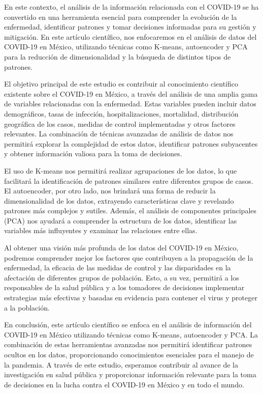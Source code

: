 \documentclass[a4paper,
               ]{jacow}
\begin{document}
En este contexto, el análisis de la información relacionada con el COVID-19 se ha convertido en una herramienta esencial para comprender la evolución de la enfermedad, identificar patrones y tomar decisiones informadas para su gestión y mitigación. En este artículo científico, nos enfocaremos en el análisis de datos del COVID-19 en México, utilizando técnicas como K-means, autoencoder y PCA para la reducción de dimensionalidad y la búsqueda de distintos tipos de patrones.

El objetivo principal de este estudio es contribuir al conocimiento científico existente sobre el COVID-19 en México, a través del análisis de una amplia gama de variables relacionadas con la enfermedad. Estas variables pueden incluir datos demográficos, tasas de infección, hospitalizaciones, mortalidad, distribución geográfica de los casos, medidas de control implementadas y otros factores relevantes. La combinación de técnicas avanzadas de análisis de datos nos permitirá explorar la complejidad de estos datos, identificar patrones subyacentes y obtener información valiosa para la toma de decisiones.

El uso de K-means nos permitirá realizar agrupaciones de los datos, lo que facilitará la identificación de patrones similares entre diferentes grupos de casos. El autoencoder, por otro lado, nos brindará una forma de reducir la dimensionalidad de los datos, extrayendo características clave y revelando patrones más complejos y sutiles. Además, el análisis de componentes principales (PCA) nos ayudará a comprender la estructura de los datos, identificar las variables más influyentes y examinar las relaciones entre ellas.

Al obtener una visión más profunda de los datos del COVID-19 en México, podremos comprender mejor los factores que contribuyen a la propagación de la enfermedad, la eficacia de las medidas de control y las disparidades en la afectación de diferentes grupos de población. Esto, a su vez, permitirá a los responsables de la salud pública y a los tomadores de decisiones implementar estrategias más efectivas y basadas en evidencia para contener el virus y proteger a la población.

En conclusión, este artículo científico se enfoca en el análisis de información del COVID-19 en México utilizando técnicas como K-means, autoencoder y PCA. La combinación de estas herramientas avanzadas nos permitirá identificar patrones ocultos en los datos, proporcionando conocimientos esenciales para el manejo de la pandemia. A través de este estudio, esperamos contribuir al avance de la investigación en salud pública y proporcionar información relevante para la toma de decisiones en la lucha contra el COVID-19 en México y en todo el mundo.
\end{document}
